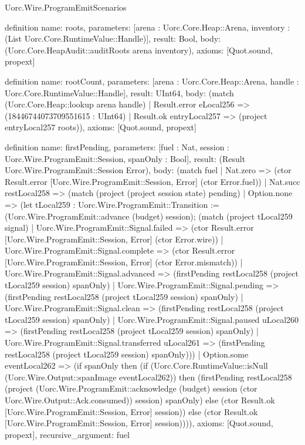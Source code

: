 \begin{lexlean}{Uorc.Wire.ProgramEmitScenarios}
\begin{semanticmodule}
definition{
  name: roots,
  parameters: [arena : Uorc.Core.Heap::Arena, inventory : (List Uorc.Core.RuntimeValue::Handle)],
  result: Bool,
  body: (Uorc.Core.HeapAudit::auditRoots arena inventory),
  axioms: [Quot.sound, propext]
}

definition{
  name: rootCount,
  parameters: [arena : Uorc.Core.Heap::Arena, handle : Uorc.Core.RuntimeValue::Handle],
  result: UInt64,
  body: (match (Uorc.Core.Heap::lookup arena handle)
    | Result.error eLocal256 => (18446744073709551615 : UInt64)
    | Result.ok entryLocal257 => (project entryLocal257 roots)),
  axioms: [Quot.sound, propext]
}

definition{
  name: firstPending,
  parameters: [fuel : Nat, session : Uorc.Wire.ProgramEmit::Session, spanOnly : Bool],
  result: (Result Uorc.Wire.ProgramEmit::Session Error),
  body: (match fuel
    | Nat.zero => (ctor Result.error [Uorc.Wire.ProgramEmit::Session, Error] (ctor Error.fuel))
    | Nat.succ restLocal258 => (match (project (project session state) pending)
      | Option.none => (let tLocal259 : Uorc.Wire.ProgramEmit::Transition := (Uorc.Wire.ProgramEmit::advance (budget) session); (match (project tLocal259 signal)
        | Uorc.Wire.ProgramEmit::Signal.failed => (ctor Result.error [Uorc.Wire.ProgramEmit::Session, Error] (ctor Error.wire))
        | Uorc.Wire.ProgramEmit::Signal.complete => (ctor Result.error [Uorc.Wire.ProgramEmit::Session, Error] (ctor Error.mismatch))
        | Uorc.Wire.ProgramEmit::Signal.advanced => (firstPending restLocal258 (project tLocal259 session) spanOnly)
        | Uorc.Wire.ProgramEmit::Signal.pending => (firstPending restLocal258 (project tLocal259 session) spanOnly)
        | Uorc.Wire.ProgramEmit::Signal.clean => (firstPending restLocal258 (project tLocal259 session) spanOnly)
        | Uorc.Wire.ProgramEmit::Signal.paused uLocal260 => (firstPending restLocal258 (project tLocal259 session) spanOnly)
        | Uorc.Wire.ProgramEmit::Signal.transferred uLocal261 => (firstPending restLocal258 (project tLocal259 session) spanOnly)))
      | Option.some eventLocal262 => (if spanOnly then (if (Uorc.Core.RuntimeValue::isNull (Uorc.Wire.Output::spanImage eventLocal262)) then (firstPending restLocal258 (project (Uorc.Wire.ProgramEmit::acknowledge (budget) session (ctor Uorc.Wire.Output::Ack.consumed)) session) spanOnly) else (ctor Result.ok [Uorc.Wire.ProgramEmit::Session, Error] session)) else (ctor Result.ok [Uorc.Wire.ProgramEmit::Session, Error] session)))),
  axioms: [Quot.sound, propext],
  recursive_argument: fuel
}


\end{semanticmodule}
\end{lexlean}
